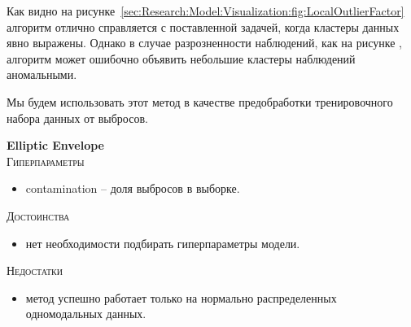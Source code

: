 \documentclass[12pt]{article}
\begin{document}
    \par Как видно на рисунке~\ref{sec:Research:Model:Visualization:fig:LocalOutlierFactor} алгоритм отлично справляется с поставленной задачей, когда кластеры данных явно выражены. Однако в случае разрозненности наблюдений, как на рисунке , алгоритм может ошибочно объявить небольшие кластеры наблюдений аномальными.

    \par Мы будем использовать этот метод в качестве предобработки тренировочного набора данных от выбросов.

    \newpage


    \textbf{Elliptic Envelope} \\

    \noindent \textsc{Гиперпараметры}
    \begin{itemize}
        \item contamination – доля выбросов в выборке.
    \end{itemize}

    \noindent \textsc{Достоинства}
    \begin{itemize}
        \item нет необходимости подбирать гиперпараметры модели.
    \end{itemize}

    \noindent \textsc{Недостатки}
    \begin{itemize}
        \item метод успешно работает только на нормально распределенных одномодальных данных.
    \end{itemize}
\end{document}
